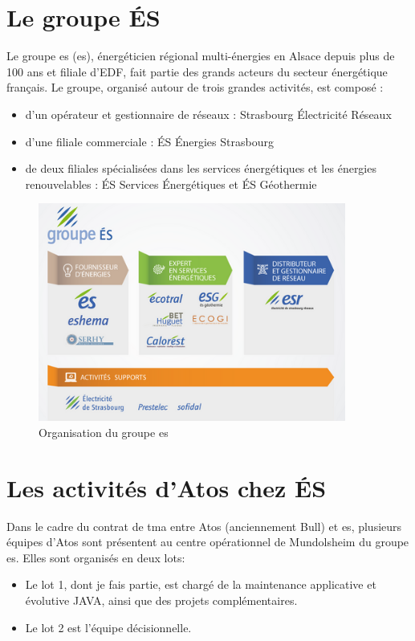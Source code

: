 \documentclass[12pt]{report}
\begin{document}
	\section{Le groupe ÉS}
	Le groupe \acrshort{es} (\acrlong{es}), énergéticien régional multi-énergies en Alsace depuis plus de 100 ans et filiale d'EDF, fait partie des grands acteurs du secteur énergétique français. Le groupe, organisé autour de trois grandes activités, est composé :
	\begin{itemize}
	    \item d’un opérateur et gestionnaire de réseaux : Strasbourg Électricité Réseaux
	    \item d'une filiale commerciale : ÉS Énergies Strasbourg
	    \item de deux filiales spécialisées dans les services énergétiques et les énergies renouvelables : ÉS Services Énergétiques et ÉS Géothermie
	\end{itemize}
	
	\begin{figure}[ht]
	    \centering
	    \includegraphics[width=0.9\textwidth]{img/orga_ES.png}
	    \caption{Organisation du groupe \acrshort{es}\cite{OrganisationES}}
	    \label{fig:orga_es}
	\end{figure}
	
	\newpage
	
	\section{Les activités d'Atos chez ÉS}
	\label{atos_es}
	Dans le cadre du contrat de \gls{tma} entre Atos (anciennement Bull) et \acrshort{es}, plusieurs équipes d'Atos sont présentent au centre opérationnel de Mundolsheim du groupe \acrshort{es}.
    Elles sont organisés en deux lots:
    \begin{itemize}
        \item Le lot 1, dont je fais partie, est chargé de la maintenance applicative et évolutive JAVA,  ainsi que des projets complémentaires.
        \item Le lot 2 est l’équipe décisionnelle.
    \end{itemize} 
    
\end{document}
